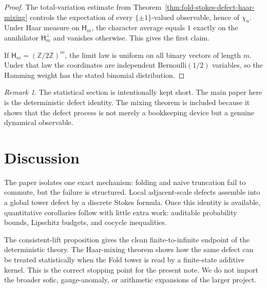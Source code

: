 \documentclass[11pt,letterpaper]{article}
\numberwithin{equation}{section}
\theoremstyle{plain}
\theoremstyle{definition}
\theoremstyle{remark}
\newtheorem{remark}[theorem]{Remark}
\newcommand{\ZZ}{\mathbb{Z}}
\begin{document}
\begin{proof}
The total-variation estimate from
Theorem~\ref{thm:fold-stokes-defect-haar-mixing} controls the expectation of
every $\{\pm 1\}$-valued observable, hence of $\chi_u$.  Under Haar measure on
$\mathsf{H}_m$, the character average equals $1$ exactly on the annihilator
$\mathsf{H}_m^\perp$ and vanishes otherwise.  This gives the first claim.

If $\mathsf{H}_m=(\ZZ/2\ZZ)^m$, the limit law is uniform on all binary vectors
of length $m$.  Under that law the coordinates are independent Bernoulli$(1/2)$
variables, so the Hamming weight has the stated binomial distribution.
\end{proof}

\begin{remark}
The statistical section is intentionally kept short.  The main paper here is
the deterministic defect identity.  The mixing theorem is included because it
shows that the defect process is not merely a bookkeeping device but a genuine
dynamical observable.
\end{remark}

\section{Discussion}

The paper isolates one exact mechanism: folding and naive truncation fail to
commute, but the failure is structured.  Local adjacent-scale defects assemble
into a global tower defect by a discrete Stokes formula.  Once this identity is
available, quantitative corollaries follow with little extra work: auditable
probability bounds, Lipschitz budgets, and cocycle inequalities.

The consistent-lift proposition gives the clean finite-to-infinite endpoint of
the deterministic theory.  The Haar-mixing theorem shows how the same defect can
be treated statistically when the Fold tower is read by a finite-state additive
kernel.  This is the correct stopping point for the present note.  We do not
import the broader sofic, gauge-anomaly, or arithmetic expansions of the larger
project.



\end{document}
